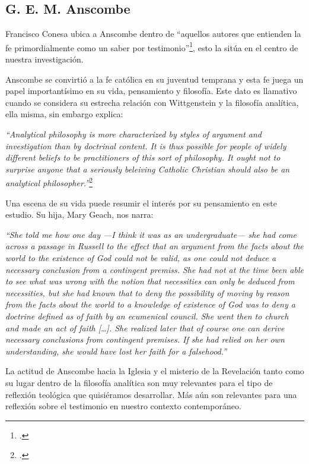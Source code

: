 \documentclass[11pt]{article}
\begin{document}
\subsection{G. E. M. Anscombe}

Francisco Conesa ubica a Anscombe dentro de ``aquellos autores que entienden la fe primordialmente como un saber por testimonio''\footcite[84]{cyc}, esto la sitúa en el centro de nuestra investigación. 

Anscombe se convirtió a la fe católica en su juventud temprana y esta fe juega un papel importantísimo en su vida, pensamiento y filosofía. Este dato es llamativo cuando se considera su estrecha relación con Wittgenstein y la filosofía analítica, ella misma, sin embargo explica:

\emph{
``Analytical philosophy is more characterized by styles of argument and investigation than by doctrinal content. It is thus possible for people of widely different beliefs to be practitioners of this sort of philosophy. It ought not to surprise anyone that a seriously beleiving Catholic Christian should also be an analytical philosopher.''}\footcite[66]{opinionsanscombe}

Una escena de su vida puede resumir el interés por su pensamiento en este estudio. Su hija, Mary Geach, nos narra:

\emph{
``She told me how one day ---I think it was as an undergraduate--- she had come across a passage in Russell to the effect that an argument from the facts about the world to the existence of God could not be valid, as one could not deduce a necessary conclusion from a contingent premiss. She had not at the time been able to see what was wrong with the notion that necessities can only be deduced from necessities, but she had known that to deny the possibility of moving by reason from the facts about the world to a knowledge of existence of God was to deny a doctrine defined as of faith by an ecumenical council. She went then to church and made an act of faith [\ldots]. She realized later that of course one can derive necessary conclusions from contingent premises. If she had relied on her own understanding, she would have lost her faith for a falsehood.''}

La actitud de Anscombe hacia la Iglesia y el misterio de la Revelación tanto como su lugar dentro de la filosofía analítica son muy relevantes para el tipo de reflexión teológica que quisiéramos desarrollar. Más aún son relevantes para una reflexión sobre el testimonio en nuestro contexto contemporáneo.
\end{document}
